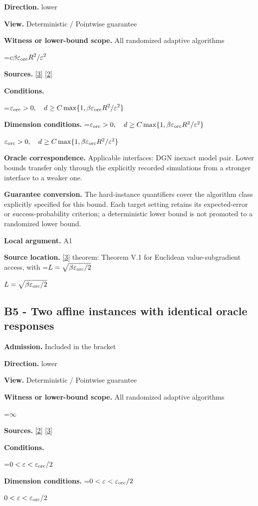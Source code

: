 \documentclass[10pt,a4paper]{article}
\newcommand{\AtlasMath}[1]{\par\begingroup\centering\setbox0=\hbox{$\displaystyle #1$}\ifdim\wd0>1.4\linewidth\typeout{ATLAS WIDE FORMULA: \the\wd0}\fi\ifdim\wd0>\linewidth\resizebox{\linewidth}{!}{\box0}\else\box0\fi\par\endgroup}
\newcommand{\AtlasInlineMath}[1]{\begingroup\setbox0=\hbox{$#1$}\ifdim\wd0>.4\linewidth\endgroup\AtlasMath{#1}\else\endgroup$#1$\fi}
\begin{document}
\textbf{Direction.} lower

\textbf{View.} Deterministic / Pointwise guarantee

\textbf{Witness or lower-bound scope.} All randomized adaptive algorithms

\AtlasMath{c\beta\varepsilon_{\rm orc}R^2/\varepsilon^2}
\textbf{Sources.} \href{https://arxiv.org/pdf/1407.5144}{[3]} \href{https://arxiv.org/pdf/2609.10874}{[2]}

\textbf{Conditions.} 
\AtlasMath{\varepsilon_{\rm orc}>0,\quad d\ge C\max\{1,\beta\varepsilon_{\rm orc}R^2/\varepsilon^2\}}


\textbf{Dimension conditions.} \AtlasInlineMath{\varepsilon_{\rm orc}>0,\quad d\ge C\max\{1,\beta\varepsilon_{\rm orc}R^2/\varepsilon^2\}}

\textbf{Oracle correspondence.} Applicable interfaces: DGN inexact model pair. Lower bounds transfer only through the explicitly recorded simulations from a stronger interface to a weaker one.

\textbf{Guarantee conversion.} The hard-instance quantifiers cover the algorithm class explicitly specified for this bound. Each target setting retains its expected-error or success-probability criterion; a deterministic lower bound is not promoted to a randomized lower bound.

\textbf{Local argument.} A1

\textbf{Source location.} \href{https://arxiv.org/pdf/1407.5144}{[3]} theorem: Theorem V.1 for Euclidean value-subgradient access, with \AtlasInlineMath{L=\sqrt{\beta\varepsilon_{\rm orc}/2}}

\subsection{B5 - Two affine instances with identical oracle responses}
\textbf{Admission.} Included in the bracket

\textbf{Direction.} lower

\textbf{View.} Deterministic / Pointwise guarantee

\textbf{Witness or lower-bound scope.} All randomized adaptive algorithms

\AtlasMath{\infty}
\textbf{Sources.} \href{https://arxiv.org/pdf/2609.10874}{[2]} \href{https://arxiv.org/pdf/1407.5144}{[3]}

\textbf{Conditions.} 
\AtlasMath{0<\varepsilon<\varepsilon_{\rm orc}/2}


\textbf{Dimension conditions.} \AtlasInlineMath{0<\varepsilon<\varepsilon_{\rm orc}/2}
\end{document}
